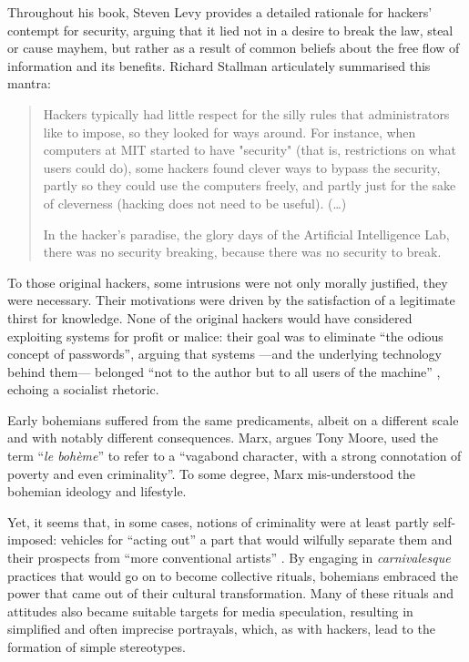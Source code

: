 Throughout his book, Steven Levy provides a detailed rationale for hackers' contempt for security, arguing that it lied not in a desire to break the law, steal or cause mayhem, but rather as a result of common beliefs about the free flow of information and its benefits. Richard Stallman articulately summarised this mantra:

\begin{quote}
Hackers typically had little respect for the silly rules that administrators like to impose, so they looked for ways around. For instance, when computers at MIT started to have "security" (that is, restrictions on what users could do), some hackers found clever ways to bypass the security, partly so they could use the computers freely, and partly just for the sake of cleverness (hacking does not need to be useful). (\ldots)

In the hacker's paradise, the glory days of the Artificial Intelligence Lab, there was no security breaking, because there was no security to break. 
\end{quote}


To those original hackers, some intrusions were not only morally justified, they were necessary. Their motivations were driven by the satisfaction of a legitimate thirst for knowledge. None of the original hackers would have considered exploiting systems for profit or malice: their goal was to eliminate ``the odious concept of passwords'', arguing that systems ---and the underlying technology behind them--- belonged ``not to the author but to all users of the machine'' \citep[p.127]{levy84}, echoing a socialist rhetoric.


Early bohemians suffered from the same predicaments, albeit on a different scale and with notably different consequences. Marx, argues Tony Moore, used the term ``\textit{le boh\`{e}me}'' to refer to a ``vagabond character, with a strong connotation of poverty and even criminality''. To some degree, Marx mis-understood the bohemian ideology and lifestyle.


Yet, it seems that, in some cases, notions of criminality were at least partly self-imposed: vehicles for ``acting out'' a part that would wilfully separate them and their prospects from ``more conventional artists'' \citep[p.30]{moore07}. By engaging in \textit{carnivalesque} practices that would go on to become collective rituals, bohemians embraced the power that came out of their cultural transformation. Many of these rituals and attitudes also became suitable targets for media speculation, resulting in simplified and often imprecise portrayals, which, as with hackers, lead to the formation of simple stereotypes.

